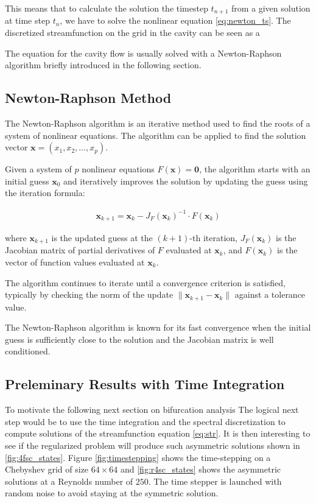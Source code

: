 This means that to calculate the solution the timestep $t_{n+1}$ from a given
solution at time step $t_n$, we have to solve the nonlinear equation
\eqref{eq:newton_ts}. The discretized streamfunction on the grid in the cavity
can be seen as a

The equation for the cavity flow is usually solved with a Newton-Raphson
algorithm \citep{kuhlmann2019} briefly introduced in the following section. 

\subsection{Newton-Raphson Method}

The Newton-Raphson algorithm is an iterative method used to find the roots of a
system of nonlinear equations. The algorithm can be applied to find the
solution vector $\mathbf{x} = (x_1, x_2, \ldots, x_p)$.

Given a system of $p$ nonlinear equations $F(\mathbf{x}) = \mathbf{0}$, the
algorithm starts with an initial guess $\mathbf{x}_0$ and iteratively improves
the solution by updating the guess using the iteration formula:

\begin{align} \mathbf{x}_{k+1} = \mathbf{x}_k - J_F(\mathbf{x}_k)^{-1} \cdot
F(\mathbf{x}_k) \end{align}

where $\mathbf{x}_{k+1}$ is the updated guess at the $(k+1)$-th iteration,
$J_F(\mathbf{x}_k)$ is the Jacobian matrix of partial derivatives of $F$
evaluated at $\mathbf{x}_k$, and $F(\mathbf{x}_k)$ is the vector of function
values evaluated at $\mathbf{x}_k$.

The algorithm continues to iterate until a convergence criterion is satisfied,
typically by checking the norm of the update $\|\mathbf{x}_{k+1} -
\mathbf{x}_k\|$ against a tolerance value.

The Newton-Raphson algorithm is known for its fast convergence when the initial
guess is sufficiently close to the solution and the Jacobian matrix is well
conditioned.

\subsection{Preleminary Results with Time Integration}

To motivate the following next section on bifurcation analysis The logical next
step would be to use the time integration and the spectral discretization to
compute solutions of the streamfunction equation \eqref{eq:str}. It is then
interesting to see if the regularized problem will produce such asymmetric
solutions shown in \ref{fig:4fsc_states}. Figure \ref{fig:timestepping} shows
the time-stepping on a Chebyshev grid of size $64 \times 64$ and
\ref{fig:r4sc_states} shows the asymmetric solutions at a Reynolds number of
$250$. The time stepper is launched with random noise to avoid staying at the
symmetric solution.

